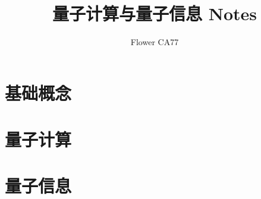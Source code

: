\documentclass[
    8pt,
    mathfont=none,
    a4paper,
    class=book
]{easybook}
\title{量子计算与量子信息 Notes}
\author{Flower CA77}
\date{}
\theoremstyle{default_style}
\begin{document}
\maketitle
\tableofcontents

\part{基础概念}



















\part{量子计算}































\part{量子信息}










\end{document}
